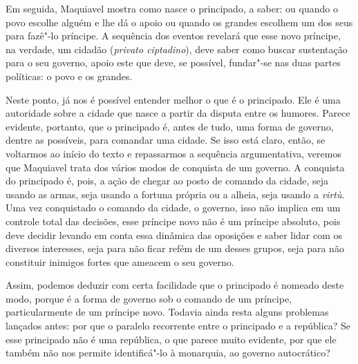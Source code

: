 Em seguida, Maquiavel mostra como nasce o principado, a saber: ou quando
o povo escolhe alguém e lhe dá o apoio ou quando os grandes escolhem um
dos seus para fazê"-lo príncipe. A sequência dos eventos revelará que
esse novo príncipe, na verdade, um cidadão (\emph{privato ciptadino}),
deve saber como buscar sustentação para o seu governo, apoio este que
deve, se possível, fundar"-se nas duas partes políticas: o povo e os
grandes.

Neste ponto, já nos é possível entender melhor o que é o principado. Ele
é uma autoridade sobre a cidade que nasce a partir da disputa entre os
humores. Parece evidente, portanto, que o principado é, antes de tudo,
uma forma de governo, dentre as possíveis, para comandar uma cidade. Se
isso está claro, então, se voltarmos ao início do texto e repassarmos a
sequência argumentativa, veremos que Maquiavel trata dos vários modos de
conquista de um governo. A conquista do principado é, pois, a ação de
chegar ao posto de comando da cidade, seja usando as armas, seja usando
a fortuna própria ou a alheia, seja usando a \emph{virtù}. Uma vez
conquistado o comando da cidade, o governo, isso não implica em um
controle total das decisões, esse príncipe novo não é um príncipe
absoluto, pois deve decidir levando em conta essa dinâmica das oposições
e saber lidar com os diversos interesses, seja para não ficar refém de
um desses grupos, seja para não constituir inimigos fortes que ameacem o
seu governo.

Assim, podemos deduzir com certa facilidade que o principado é nomeado
deste modo, porque é a forma de governo sob o comando de um príncipe,
particularmente de um príncipe novo. Todavia ainda resta alguns
problemas lançados antes: por que o paralelo recorrente entre o
principado e a república? Se esse principado não é uma república, o que
parece muito evidente, por que ele também não nos permite identificá"-lo
à monarquia, ao governo autocrático?

